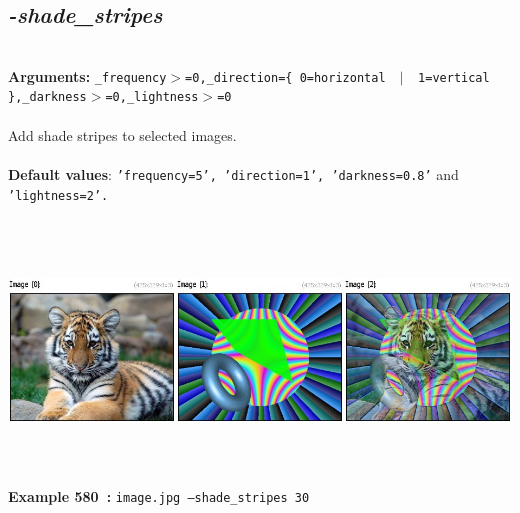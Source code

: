 \documentclass[a4paper,11pt,twoside]{book}
\begin{document}
\subsection{\emph{-shade\_stripes} }\vspace*{-0.5em}
~\\\textbf{Arguments: } 
{\small \texttt{\_frequency$>$=0,\_direction=\{ 0=horizontal ~$|$~ 1=vertical \},\_darkness$>$=0,\_lightness$>$=0}}\\~\\
Add shade stripes to selected images.
~\\~\\\textbf{Default values}: {\small \texttt{'frequency=5', 'direction=1', 'darkness=0.8'} and \texttt{'lightness=2'.}}
\begin{center}\includegraphics[keepaspectratio=true,height=7cm,width=\textwidth]{img/gmic_def580.jpg}\\
{\footnotesize \textbf{Example 580~:} \texttt{image.jpg --shade\_stripes 30}}
\end{center}
\end{document}
